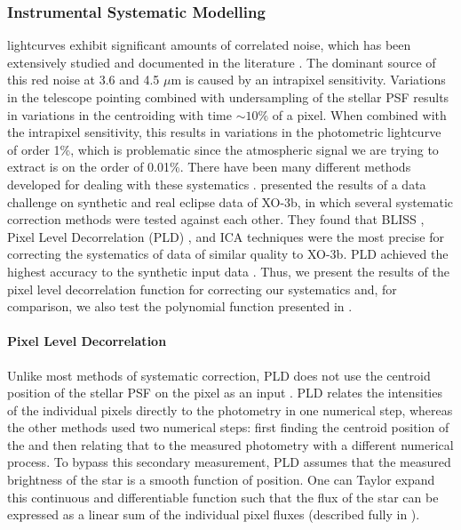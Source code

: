 \subsubsection{Instrumental Systematic Modelling}
\label{P1:subsec:systematics}

\spitzer lightcurves exhibit significant amounts of correlated noise, which has been extensively studied and documented in the literature \citep{Charbonneau2005, Agol2010, Seager2010, Stevenson2010b}. The dominant source of this red noise at 3.6 and 4.5 $\mu$m is caused by an intrapixel sensitivity. Variations in the telescope pointing combined with undersampling of the stellar PSF results in variations in the centroiding with time $\sim10\%$ of a pixel. When combined with the intrapixel sensitivity, this results in variations in the photometric lightcurve of order 1\%, which is problematic since the atmospheric signal we are trying to extract is on the order of 0.01\%. There have been many different methods developed for dealing with these systematics \citep[e.g.,][]{Reach2005, Charbonneau2008, Ballard2010, Stevenson2012, Gibson2012, Morello2015a, Morello2015b, Deming2015}. \citet{Ingalls2016} presented the results of a data challenge on synthetic and real eclipse data of XO-3b, in which several systematic correction methods were tested against each other. They found that BLISS \citep{Stevenson2012}, Pixel Level Decorrelation (PLD) \citep{Deming2015}, and ICA techniques \citep{Morello2015a} were the most precise for correcting the systematics of data of similar quality to XO-3b. PLD achieved the highest accuracy to the synthetic input data \citep{Deming2015}. Thus, we present the results of the pixel level decorrelation function for correcting our systematics and, for comparison, we also test the polynomial function presented in \citet{Knutson2008}.


\paragraph{Pixel Level Decorrelation}

Unlike most methods of systematic correction, PLD does not use the centroid position of the stellar PSF on the pixel as an input \citep{Deming2015}. PLD relates the intensities of the individual pixels directly to the photometry in one numerical step, whereas the other methods used two numerical steps: first finding the centroid position of the and then relating that to the measured photometry with a different numerical process. To bypass this secondary measurement, PLD assumes that the measured brightness of the star is a smooth function of position. One can Taylor expand this continuous and differentiable function such that the flux of the star can be expressed as a linear sum of the individual pixel fluxes (described fully in \citet{Deming2015}).

